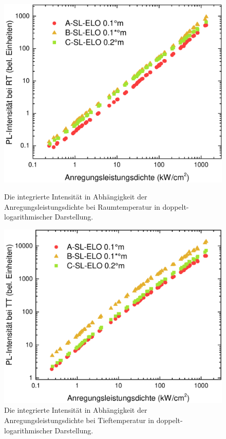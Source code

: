 \begin{figure}[H]
  \centering
  \begin{minipage}[t]{0.49\textwidth}
    \centering
    \includegraphics[width=\textwidth]{Bilder/TS4048/intRT.pdf}
		\caption{Die integrierte Intensität in Abhängigkeit der Anregungsleistungsdichte bei Raumtemperatur in doppelt-logarithmischer Darstellung.}
    \label{fig:eloINTrt}
  \end{minipage}
  \begin{minipage}[t]{0.49\textwidth}
    \centering
    \includegraphics[width=\linewidth]{Bilder/TS4048/intTT.pdf}
		\caption{Die integrierte Intensität in Abhängigkeit der Anregungsleistungsdichte bei Tieftemperatur in doppelt-logarithmischer Darstellung.}
		\label{fig:sleloINTtt}
  \end{minipage}
\end{figure}
